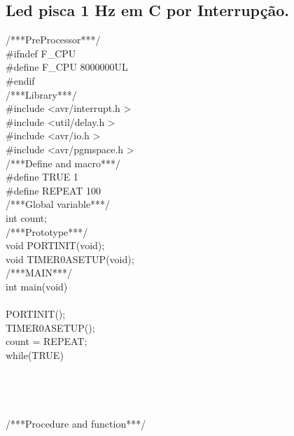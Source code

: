 \documentclass[titlepage, a4paper, 10pt, reqno, openany]{report}
\begin{document}

	\subsection {Led pisca 1 Hz em C por Interrup\c{c}\~{a}o.}
\begin{minipage}[T]{.3\linewidth}
/***PreProcessor***/ \\
\#ifndef F\_CPU \\
\hspace*{1cm} \#define F\_CPU 8000000UL \\
\#endif \\
/***Library***/ \\
\#include \textless avr/interrupt.h \textgreater \\
\#include \textless util/delay.h \textgreater \\
\#include \textless avr/io.h \textgreater \\
\#include \textless avr/pgmspace.h \textgreater \\
/***Define and macro***/ \\
\#define TRUE 1 \\
\#define REPEAT 100 \\
/***Global variable***/ \\
int count; \\
/***Prototype***/ \\
void PORTINIT(void); \\
void TIMER0ASETUP(void); \\
/***MAIN***/ \\
int main(void) \\
\textbraceleft \\
\hspace*{.5cm}	PORTINIT(); \\
\hspace*{.5cm}	TIMER0ASETUP(); \\
\hspace*{.5cm}	count = REPEAT; \\
\hspace*{.5cm}	while(TRUE) \\
\hspace*{.5cm}	\textbraceleft \\
\hspace*{1cm}   \\
\hspace*{.5cm}	\textbraceright \\
\textbraceright \\
/***Procedure and function***/ \\

\end{minipage}
\end{document}
